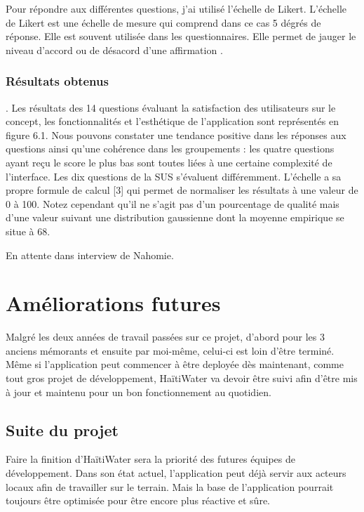 \documentclass{EPL-master-thesis-covers-FR}
\begin{document}
				Pour répondre aux différentes questions, j'ai utilisé l'échelle de Likert. L'échelle de Likert est une échelle de mesure qui comprend dans ce cas 5 dégrés de réponse. Elle est souvent utilisée dans les questionnaires. Elle permet de jauger le niveau d'accord ou de désacord d'une affirmation \cite{ref:likert}.
				
	
			\subsection*{Résultats obtenus}
				
			
			
			.
Les résultats des 14 questions évaluant la satisfaction des utilisateurs sur le
concept, les fonctionnalités et l’esthétique de l’application sont représentés en
figure 6.1.
Nous pouvons constater une tendance positive dans les réponses aux questions
ainsi qu’une cohérence dans les groupements : les quatre questions ayant reçu le
score le plus bas sont toutes liées à une certaine complexité de l’interface.
Les dix questions de la SUS s’évaluent différemment. L’échelle a sa propre
formule de calcul [3] qui permet de normaliser les résultats à une valeur de 0 à
100. Notez cependant qu’il ne s’agit pas d’un pourcentage de qualité mais d’une
valeur suivant une distribution gaussienne dont la moyenne empirique se situe à 68.

				En attente dans interview de Nahomie.
				


	\chapter{Améliorations futures}
		Malgré les deux années de travail passées sur ce projet, d'abord pour les 3 anciens mémorants \cite{ref:haitiwater} et ensuite par moi-même, celui-ci est loin d'être terminé. Même si l'application peut commencer à être deployée dès maintenant, comme tout gros projet de développement, HaïtiWater va devoir être suivi afin d'être mis à jour et maintenu pour un bon fonctionnement au quotidien. 

		\section{Suite du projet}
			\label{ref:suite_projet}
			Faire la finition d'HaïtiWater sera la priorité des futures équipes de développement. Dans son état actuel, l'application peut déjà servir aux acteurs locaux afin de travailler sur le terrain. Mais la base de l'application pourrait toujours être optimisée pour être encore plus réactive et sûre.		
			
\end{document}
